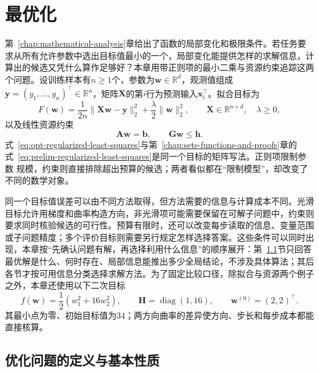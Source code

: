 \chapter{最优化}
\label{chap:optimization}

第~\ref{chap:mathematical-analysis}章给出了函数的局部变化和极限条件。若任务要求从所有允许参数中选出目标值最小的一个，局部变化能提供怎样的求解信息，计算出的候选又凭什么算作足够好？本章用带正则项的最小二乘与资源约束追踪这两个问题。设训练样本有$n\geq1$个，参数为$\bm w\in\mathbb R^d$，观测值组成$\bm y=(y_1,\ldots,y_n)^\top\in\mathbb R^n$，矩阵$\bm X$的第$i$行为预测输入$\bm x_i^\top$。拟合目标为
\begin{equation}
  F(\bm{w})
  =
  \frac{1}{2n}\lVert \bm{X}\bm{w}-\bm{y}\rVert_2^2
  +\frac{\lambda}{2}\lVert\bm{w}\rVert_2^2,
  \qquad
  \bm{X}\in\mathbb{R}^{n\times d},\quad \lambda\geq 0,
  \label{eq:opt-regularized-least-squares}
\end{equation}
以及线性资源约束
\begin{equation}
  \bm{A}\bm{w}=\bm{b},\qquad
  \bm{G}\bm{w}\leq\bm{h}.
  \label{eq:opt-linear-resource-constraints}
\end{equation}
式~\eqref{eq:opt-regularized-least-squares}与第~\ref{chap:sets-functions-and-proofs}章的
式~\eqref{eq:prelim-regularized-least-squares}是同一个目标的矩阵写法。正则项限制参数
规模，约束则直接排除超出预算的候选；两者看似都在“限制模型”，却改变了不同的数学对象。

同一个目标值误差可以由不同方法取得，但方法需要的信息与计算成本不同。光滑目标允许用梯度和曲率构造方向，非光滑项可能需要保留在可解子问题中，约束则要求同时核验候选的可行性。预算有限时，还可以改变每步读取的信息、变量范围或子问题精度；多个评价目标则需要另行规定怎样选择答案。这些条件可以同时出现，本章按“先确认问题有解，再选择利用什么信息”的顺序展开：第~\ref{sec:opt-objectives-solutions-curvature}节只回答最优解是什么、何时存在、局部信息能推出多少全局结论，不涉及具体算法；其后各节才按可用信息分类选择求解方法。为了固定比较口径，除拟合与资源两个例子之外，本章还使用以下二次目标
\begin{equation}
 f(\bm w)=\frac12(w_1^2+16w_2^2),\qquad
 \bm H=\operatorname{diag}(1,16),\qquad
 \bm w^{(0)}=(2,2)^\top.
 \label{eq:opt-common-quadratic}
\end{equation}
其最小点为零、初始目标值为$34$；两方向曲率的差异使方向、步长和每步成本都能直接核算。

\section{优化问题的定义与基本性质}
\label{sec:opt-objectives-solutions-curvature}

